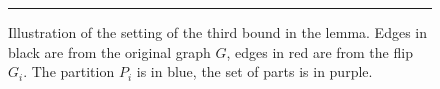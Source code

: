 \begin{figure}[h]
\centering
\rule{4cm}{1cm}
\caption{Illustration of the setting of the third bound in the lemma. Edges in black are from the original graph $G$, edges in red are from the flip $G_i$. The partition $P_i$ is in blue, the set of parts is in purple.}
\end{figure}
